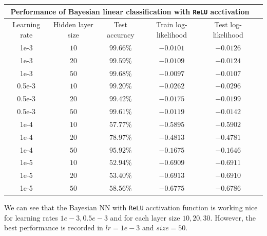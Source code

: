 \documentclass[12pt, fullpage,letterpaper]{article}
\begin{document}
\begin{enumerate}
\begin{enumerate}
{\begin{center}
\begin{tabular}{ |c||c|c|c|c|c|}
 \hline
 \multicolumn{5}{|c|}{Performance of Bayesian linear classification with \texttt{ReLU} acctivation} \\
 \hline
Learning rate & Hidden layer size & Test accuracy & Train log-likelihood &  Test log-likelihood\\
 \hline
 1e-3   & $10$    & $99.66\%$ &   $-0.0101$ & $-0.0126$\\ 
 \hline
 1e-3   & $20$    & $99.59\%$ &   $-0.0109$ & $-0.0124$\\
 \hline
 1e-3   & $50$    & $99.68\%$ &  $-0.0097$  & $-0.0107$\\
  \hline
  \hline
 0.5e-3   & $10$    & $99.20\%$ &   $-0.0262$ & $-0.0296$\\  
 \hline
 0.5e-3   & $20$    & $99.42\%$ &   $-0.0175$ & $-0.0199$\\
\hline
 0.5e-3   & $50$    & $99.61\%$ &   $-0.0119$ & $-0.0142$\\
 \hline
 \hline
 1e-4   & $10$    & $57.77\%$ &   $-0.5895$ & $-0.5902$\\  
 \hline
 1e-4   & $20$    & $78.97\%$ &   $-0.4813$ & $-0.4781$\\
\hline
 1e-4   & $50$    & $95.92\%$ &   $-0.1675$ & $-0.1646$ \\ 
 \hline
 \hline
 1e-5   & $10$    & $52.94\%$ & $-0.6909$     &  $-0.6911$\\  
 \hline
 1e-5   & $20$    & $53.40\%$ &   $-0.6913$ & $-0.6910$\\
\hline
 1e-5   & $50$    & $58.56\%$ &   $-0.6775$  & $-0.6786$\\
 \hline
\end{tabular}
\end{center}
We can see that the Bayesian NN with \texttt{ReLU} acctivation function is working nice for learning rates $1e-3, 0.5e-3$ and for each layer size $10,20,30$. However, the best performance is recorded in $lr =1e-3$ and $size = 50$.


}
\end{enumerate}
\end{enumerate}
\end{document}
